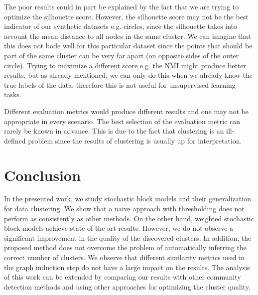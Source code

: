 \documentclass[conference]{IEEEtran}
\begin{document}
The poor results could in part be explained by the fact that we are trying to optimize the silhouette score. However, the silhouette score may not be the best indicator of our synthetic datasets e.g. circles, since the silhouette takes into account the mean distance to all nodes in the same cluster. We can imagine that this does not bode well for this particular dataset since the points that should be part of the same cluster can be very far apart (on opposite sides of the outer circle). Trying to maximize a different score e.g. the NMI might produce better results, but as already mentioned, we can only do this when we already know the true labels of the data, therefore this is not useful for unsupervised learning tasks.

Different evaluation metrics would produce different results and one may not be appropriate in every scenario. The best selection of the evaluation metric can rarely be known in advance. This is due to the fact that clustering is an ill-defined problem since the results of clustering is usually up for interpretation.

\section{Conclusion}

In the presented work, we study stochastic block models and their generalization for data clustering. We show that a naive approach with thresholding does not perform as consistently as other methods. On the other hand, weighted stochastic block models achieve state-of-the-art results. However, we do not observe a significant improvement in the quality of the discovered clusters. In addition, the proposed method does not overcome the problem of automatically inferring the correct number of clusters. We observe that different similarity metrics used in the graph induction step do not have a large impact on the results. The analysis of this work can be extended by comparing our results with other community detection methods and using other approaches for optimizing the cluster quality.




\end{document}
